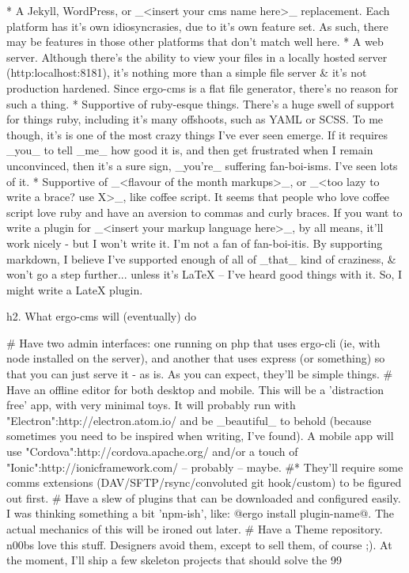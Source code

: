 * A Jekyll, WordPress, or _<insert your cms name here>_ replacement. Each platform has it's own idiosyncrasies, due to it's own feature set. As such, there may be features in those other platforms that don't match well here.
* A web server. Although there's the ability to view your files in a locally hosted server (http:localhost:8181), it's nothing more than a simple file server & it's not production hardened. Since ergo-cms is a flat file generator, there's no reason for such a thing.
* Supportive of ruby-esque things. There's a huge swell of support for things ruby, including it's many offshoots, such as YAML or SCSS. To me though, it's is one of the most crazy things I've ever seen emerge. If it requires _you_ to tell _me_ how good it is, and then get frustrated when I remain unconvinced, then it's a sure sign, _you're_ suffering fan-boi-isms. I've seen lots of it.
* Supportive of _<flavour of the month markups>_, or _<too lazy to write a brace? use X>_, like coffee script. It seems that people who love coffee script love ruby and have an aversion to commas and curly braces. If you want to write a plugin for _<insert your markup language here>_, by all means, it'll work nicely - but I won't write it. I'm not a fan of fan-boi-itis. By supporting markdown, I believe I've supported enough of all of _that_ kind of craziness, & won't go a step further... unless it's LaTeX -- I've heard good things with it. So, I might write a LateX plugin. 



h2. What ergo-cms will (eventually) do

# Have two admin interfaces: one running on php that uses ergo-cli (ie, with node installed on the server), and another that uses express (or something) so that you can just serve it - as is. As you can expect, they'll be simple things.
# Have an offline editor for both desktop and mobile. This will be a 'distraction free' app, with very minimal toys. It will probably run with "Electron":http://electron.atom.io/ and be _beautiful_ to behold (because sometimes you need to be inspired when writing, I've found). A mobile app will use "Cordova":http://cordova.apache.org/ and/or a touch of "Ionic":http://ionicframework.com/ -- probably -- maybe. 
#* They'll require some comms extensions (DAV/SFTP/rsync/convoluted git hook/custom) to be figured out first.
# Have a slew of plugins that can be downloaded and configured easily. I was thinking something a bit 'npm-ish', like: @ergo install plugin-name@. The actual mechanics of this will be ironed out later.
# Have a Theme repository. n00bs love this stuff. Designers avoid them, except to sell them, of course ;). At the moment, I'll ship a few skeleton projects that should solve the 99%


